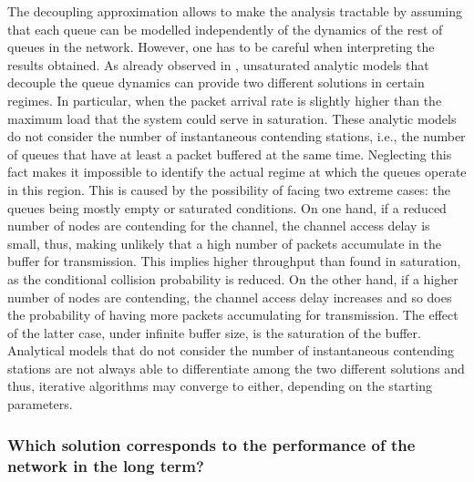 \documentclass[preprint,12pt]{elsarticle}
\begin{document}
The decoupling approximation allows to make the analysis tractable by assuming that each queue can be modelled independently of the dynamics of the rest of queues in the network. However, one has to be careful when interpreting the results obtained. As already observed in \cite{Duffy2010}, unsaturated analytic models that decouple the queue dynamics can provide two different solutions in certain regimes. In particular, when the packet arrival rate is slightly higher than the maximum load that the system could serve in saturation. These analytic models do not consider the number of instantaneous contending stations, i.e., the number of queues that have at least a packet buffered at the same time. Neglecting this fact makes it impossible to identify the actual regime at which the queues operate in this region. This is caused by the possibility of facing two extreme cases: the queues being mostly empty or saturated conditions. On one hand, if a reduced number of nodes are contending for the channel, the channel access delay is small, thus, making unlikely that a high number of packets accumulate in the buffer for transmission. This implies higher throughput than found in saturation, as the conditional collision probability is reduced. On the other hand, if a higher number of nodes are contending, the channel access delay increases and so does the probability of having more packets accumulating for transmission. The effect of the latter case, under infinite buffer size, is the saturation of the buffer. Analytical models that do not consider the number of instantaneous contending stations are not always able to differentiate among the two different solutions and thus, iterative algorithms may converge to either, depending on the starting parameters.

\subsubsection{Which solution corresponds to the performance of the network in the long term?}
\end{document}
